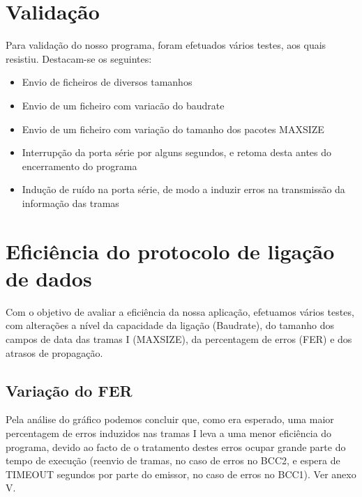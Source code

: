 \documentclass[article, a4paper, 11pt, oneside]{memoir}
\begin{document}
\chapter[Validação][Validação]{Validação} \label{\thechapter}

Para validação do nosso programa, foram efetuados vários testes, aos quais resistiu. Destacam-se os seguintes:

\begin{itemize}
	\item Envio de ficheiros de diversos tamanhos
	\item Envio de um ficheiro com variacão do baudrate
	\item Envio de um ficheiro com variação do tamanho dos pacotes MAX\textunderscore SIZE
	\item Interrupção da porta série por alguns segundos, e retoma desta antes do encerramento do programa
	\item Indução de ruído na porta série, de modo a induzir erros na transmissão da informação das tramas
\end{itemize}

\chapter[Eficiência do protocolo de ligação de dados][Eficiência do protocolo de ligação de dados]{Eficiência do protocolo de ligação de dados} \label{\thechapter}

Com o objetivo de avaliar a eficiência da nossa aplicação, efetuamos vários testes, com alterações a nível da capacidade
da ligação (Baudrate), do tamanho dos campos de data das tramas I (MAX\textunderscore SIZE), da percentagem de erros (FER) e dos atrasos de propagação.

\section{Variação do FER}

Pela análise do gráfico podemos concluir que, como era esperado, uma maior percentagem de erros
induzidos nas tramas I leva a uma menor eficiência do programa, devido ao facto de o tratamento destes erros ocupar grande parte do tempo de execução
(reenvio de tramas, no caso de erros no BCC2, e espera de TIMEOUT segundos por parte do emissor, no caso de erros no BCC1). Ver anexo V.
\end{document}
